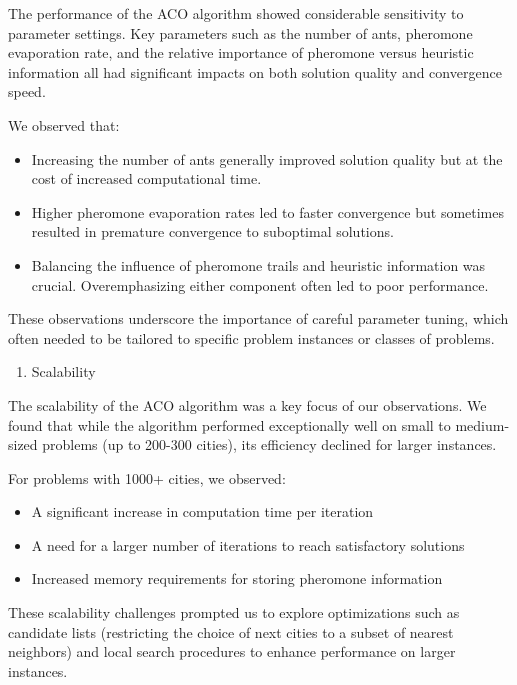 \documentclass[
]{article}
\begin{document}
The performance of the ACO algorithm showed considerable sensitivity to
parameter settings. Key parameters such as the number of ants, pheromone
evaporation rate, and the relative importance of pheromone versus
heuristic information all had significant impacts on both solution
quality and convergence speed.

We observed that:

\begin{itemize}
\item
  Increasing the number of ants generally improved solution quality but
  at the cost of increased computational time.
\item
  Higher pheromone evaporation rates led to faster convergence but
  sometimes resulted in premature convergence to suboptimal solutions.
\item
  Balancing the influence of pheromone trails and heuristic information
  was crucial. Overemphasizing either component often led to poor
  performance.
\end{itemize}

These observations underscore the importance of careful parameter
tuning, which often needed to be tailored to specific problem instances
or classes of problems.

\begin{enumerate}
\def\labelenumi{\arabic{enumi}.}
\setcounter{enumi}{2}
\item
  Scalability
\end{enumerate}

The scalability of the ACO algorithm was a key focus of our
observations. We found that while the algorithm performed exceptionally
well on small to medium-sized problems (up to 200-300 cities), its
efficiency declined for larger instances.

For problems with 1000+ cities, we observed:

\begin{itemize}
\item
  A significant increase in computation time per iteration
\item
  A need for a larger number of iterations to reach satisfactory
  solutions
\item
  Increased memory requirements for storing pheromone information
\end{itemize}

These scalability challenges prompted us to explore optimizations such
as candidate lists (restricting the choice of next cities to a subset of
nearest neighbors) and local search procedures to enhance performance on
larger instances.
\end{document}
